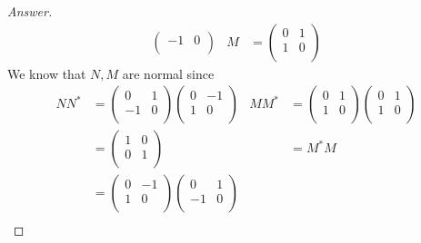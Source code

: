 \documentclass[../psets.tex]{subfiles}
\begin{document}
\begin{enumerate}[label={\textbf{2.\arabic*.}}]
\begin{proof}[Answer]
\begin{align*}
\begin{pmatrix}
                -1 & 0\\
            \end{pmatrix}&
            M &=
            \begin{pmatrix}
                0 & 1\\
                1 & 0\\
            \end{pmatrix}
        \end{align*}
        We know that $N,M$ are normal since
        \begin{align*}
            NN^* &=
            \begin{pmatrix}
                0 & 1\\
                -1 & 0\\
            \end{pmatrix}
            \begin{pmatrix}
                0 & -1\\
                1 & 0\\
            \end{pmatrix}&
                MM^* &=
                \begin{pmatrix}
                    0 & 1\\
                    1 & 0\\
                \end{pmatrix}
                \begin{pmatrix}
                    0 & 1\\
                    1 & 0\\
                \end{pmatrix}\\
            &=
            \begin{pmatrix}
                1 & 0\\
                0 & 1\\
            \end{pmatrix}&
                &= M^*M\\
            &=
            \begin{pmatrix}
                0 & -1\\
                1 & 0\\
            \end{pmatrix}
            \begin{pmatrix}
                0 & 1\\
                -1 & 0\\
            \end{pmatrix}\\

\end{align*}
\end{proof}
\end{enumerate}
\end{document}
